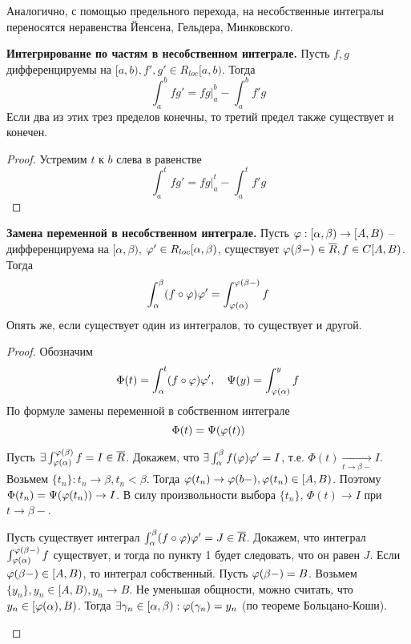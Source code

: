 \begin{MyList}
	\begin{Rem}
		Аналогично, с помощью предельного перехода, на несобственные интегралы переносятся неравенства Йенсена, Гельдера, Минковского.
	\end{Rem}

	\item \textbf{Интегрирование по частям в несобственном интеграле.} Пусть $f, g$ дифференцируемы на $[a, b), f', g' \in R_{loc}[a, b)$.
	Тогда
	\[\int_a^b fg' = \left.fg\right|_a^b - \int_a^b f'g\]
	Если два из этих трез пределов конечны, то третий предел также существует и конечен.

	\begin{proof}
		Устремим $t$ к $b$ слева в равенстве
		\[\int_a^t fg' = \left.fg\right|_a^t - \int_a^t f'g\]
	\end{proof}

	\item \textbf{Замена переменной в несобственном интеграле.} 
	Пусть $\varphi : [\alpha, \beta) \to [A, B)$ -- дифференцируема на $[\alpha, \beta)$, $\varphi' \in R_{loc}[\alpha, \beta)$, существует 
	$\varphi(\beta -) \in \overline{R}, f \in C[A, B)$. Тогда
	\[\int_\alpha^\beta (f \circ \varphi)\varphi' = \int_{\varphi(\alpha)}^{\varphi(\beta-)} f\]
	Опять же, если существует один из интегралов, то существует и другой.    

	\begin{proof}
		Обозначим
		\[\Phi(t) = \int_\alpha^t (f \circ \varphi) \varphi', \quad \Psi(y) = \int_{\varphi(\alpha)}^y f\]
		По формуле замены переменной в собственном интеграле 
		\[\Phi(t) = \Psi(\varphi(t))\]

		\begin{MyList}
			\item Пусть $\exists \int_{\varphi(\alpha)}^{\varphi(\beta)} f = I \in \overline{R}$. Докажем, что $\exists \int_\alpha^\beta f(\varphi)\varphi' = I$, т.е.
			$\Phi(t) \xrightarrow[t \to \beta-]{} I$. Возьмем $\{t_n\} : t_n \to \beta, t_n < \beta$. 
			Тогда $\varphi(t_n) \to \varphi(b-), \varphi(t_n) \in [A, B)$. Поэтому $\Phi(t_n) = \Psi(\varphi(t_n)) \to I$. В силу произвольности выбора $\{t_n\}$, $\Phi(t) \to I$ при $t \to \beta-$.
			
			\item Пусть существует интеграл $\int_\alpha^\beta (f \circ \varphi) \varphi' = J \in \overline{R}$. 
			Докажем, что интеграл $\int_{\varphi(\alpha)}^{\varphi(\beta-)} f$ существует, и тогда по пункту 1 будет следовать, что он равен $J$. 
			Если $\varphi(\beta -) \in [A, B)$, то интеграл собственный. 
			Пусть $\varphi(\beta-) = B$. Возьмем $\{y_n\}, y_n \in [A, B), y_n \to B$. Не уменьшая общности, можно считать, что $y_n \in [\varphi(\alpha), B)$.
			Тогда $\exists \gamma_n \in [\alpha, \beta) : \varphi(\gamma_n) = y_n$ (по теореме Больцано-Коши).


\end{MyList}
\end{proof}
\end{MyList}
